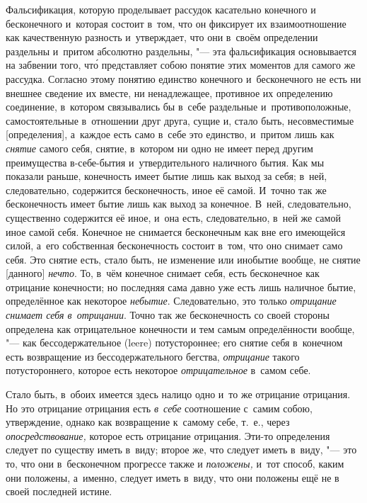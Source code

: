 Фальсификация, которую проделывает рассудок касательно конечного и
бесконечного и~которая состоит в~том, что он фиксирует их взаимоотношение
как качественную разность и~утверждает, что они в~своём определении
раздельны и~притом абсолютно раздельны, "--- эта фальсификация основывается на
забвении того, чт\'{о} представляет собою понятие этих моментов для самого же
рассудка. Согласно этому понятию единство конечного и~бесконечного не есть
ни внешнее сведение их вместе, ни ненадлежащее, противное их определению
соединение, в~котором связывались бы в~себе раздельные и~противоположные,
самостоятельные в~отношении друг друга, сущие и, стало быть, несовместимые
[определения], а~каждое есть само в~себе это единство, и~притом лишь как
{\em снятие} самого себя, снятие, в~котором ни одно не
имеет перед другим преимущества в-себе-бытия и~утвердительного наличного
бытия. Как мы показали раньше, конечность имеет бытие лишь как выход за
себя; в~ней, следовательно, содержится бесконечность, иное её самой.
И~точно так же бесконечность имеет бытие лишь как выход за конечное. В~ней,
следовательно, существенно содержится её иное, и~она есть, следовательно,
в~ней же самой иное самой себя. Конечное не снимается бесконечным как вне
его имеющейся силой, а~его собственная бесконечность состоит в~том, что оно
снимает само себя. Это снятие есть, стало быть, не изменение или инобытие
вообще, не снятие [данного] {\em нечто}. То, в~чём
конечное снимает себя, есть бесконечное как отрицание конечности; но
последняя сама давно уже есть лишь наличное бытие, определённое как
некоторое {\em небытие}. Следовательно, это только
{\em отрицание снимает себя в~отрицании}. Точно так же
бесконечность со своей стороны определена как отрицательное конечности и
тем самым определённости вообще, "--- как бессодержательное (leere)
потустороннее; его снятие себя в~конечном есть возвращение из
бессодержательного бегства, {\em отрицание} такого
потустороннего, которое есть некоторое
{\em отрицательное} в~самом себе.

Стало быть, в~обоих имеется здесь налицо одно и~то же отрицание отрицания.
Но это отрицание отрицания есть {\em в~себе}
соотношение с~самим собою, утверждение, однако как возвращение к~самому
себе, т.~е., через {\em опосредствование,} которое есть
отрицание отрицания. Эти-то определения следует по существу иметь в~виду;
второе же, что следует иметь в~виду, "--- это то, что они в~бесконечном
прогрессе также и {\em положены,} и~тот способ, каким
они положены, а~именно, следует иметь в~виду, что они положены ещё не в
своей последней истине.

